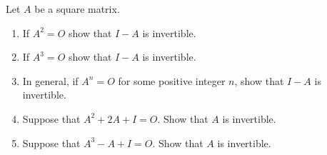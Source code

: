 \begin{exercise}
    Let $A$ be a square matrix.
    \begin{enumerate}[label={(\alph*)}]
        \item If $A^{2} = O$ show that $I - A$ is invertible.
        \item If $A^{3} = O$ show that $I - A$ is invertible.
        \item In general, if $A^{n} = O$ for some positive integer $n$, show that $I - A$ is invertible.
        \item Suppose that $A^{2} + 2A + I = O$. Show that $A$ is invertible.
        \item Suppose that $A^{3} - A + I = O$. Show that $A$ is invertible.
    \end{enumerate}
\end{exercise}


